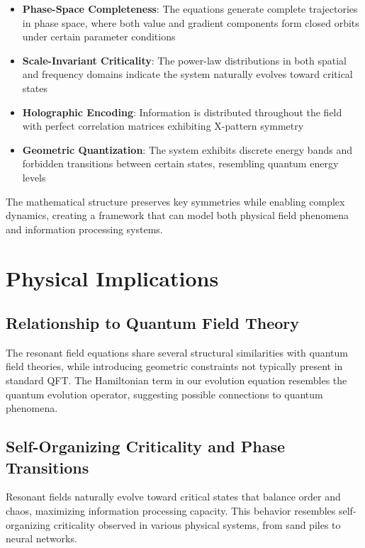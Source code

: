 \documentclass[12pt,letterpaper]{article}
\begin{document}
\begin{itemize}
    \item \textbf{Phase-Space Completeness}: The equations generate complete trajectories in phase space, where both value and gradient components form closed orbits under certain parameter conditions
    \item \textbf{Scale-Invariant Criticality}: The power-law distributions in both spatial and frequency domains indicate the system naturally evolves toward critical states
    \item \textbf{Holographic Encoding}: Information is distributed throughout the field with perfect correlation matrices exhibiting X-pattern symmetry
    \item \textbf{Geometric Quantization}: The system exhibits discrete energy bands and forbidden transitions between certain states, resembling quantum energy levels
\end{itemize}

The mathematical structure preserves key symmetries while enabling complex dynamics, creating a framework that can model both physical field phenomena and information processing systems.

\section{Physical Implications}
\label{sec:physical_implications}

\vspace{2mm}
\subsection{Relationship to Quantum Field Theory}
\label{subsec:quantum_field_theory}

The resonant field equations share several structural similarities with quantum field theories, while introducing geometric constraints not typically present in standard QFT. The Hamiltonian term in our evolution equation resembles the quantum evolution operator, suggesting possible connections to quantum phenomena.

\vspace{2mm}
\subsection{Self-Organizing Criticality and Phase Transitions}
\label{subsec:self_organizing}

Resonant fields naturally evolve toward critical states that balance order and chaos, maximizing information processing capacity. This behavior resembles self-organizing criticality observed in various physical systems, from sand piles to neural networks.
\end{document}
